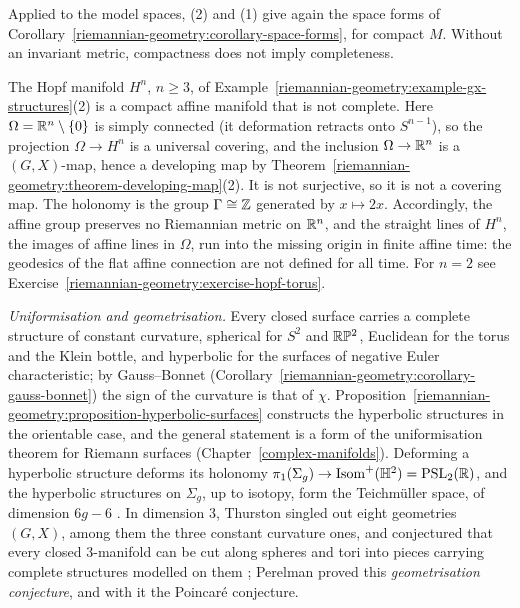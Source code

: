 Applied to the model spaces, (2) and (1) give again the space forms of Corollary~\ref{riemannian-geometry:corollary-space-forms}, for compact $M$. Without an invariant metric, compactness does not imply completeness.

\begin{example}\label{riemannian-geometry:example-hopf-incomplete}
The Hopf manifold $H^n$, $n \geq 3$, of Example~\ref{riemannian-geometry:example-gx-structures}(2) is a compact affine manifold that is not complete. Here $\Omega = \mathbb{R}^n \setminus \{0\}$ is simply connected (it deformation retracts onto
$S^{n-1}$), so the projection $\Omega \to H^n$ is a universal covering, and the inclusion $\Omega \to \mathbb{R}^n$ is a $(G, X)$-map, hence a developing map by Theorem~\ref{riemannian-geometry:theorem-developing-map}(2). It is not surjective,
so it is not a covering map. The holonomy is the group $\Gamma \cong \mathbb{Z}$ generated by $x \mapsto 2x$. Accordingly, the affine group preserves no Riemannian metric on $\mathbb{R}^n$, and the straight lines of $H^n$, the images of affine
lines in $\Omega$, run into the missing origin in finite affine time: the geodesics of the flat affine connection are not defined for all time. For $n = 2$ see Exercise~\ref{riemannian-geometry:exercise-hopf-torus}.
\end{example}

\begin{remark}\label{riemannian-geometry:remark-geometrisation}
\emph{Uniformisation and geometrisation.} Every closed surface carries a complete structure of constant curvature, spherical for $S^2$ and $\mathbb{R}\mathbb{P}^2$, Euclidean for the torus and the Klein bottle, and hyperbolic for the surfaces of
negative Euler characteristic; by Gauss--Bonnet (Corollary~\ref{riemannian-geometry:corollary-gauss-bonnet}) the sign of the curvature is that of $\chi$. Proposition~\ref{riemannian-geometry:proposition-hyperbolic-surfaces}
constructs the hyperbolic structures in the orientable case, and the general statement is a form of the uniformisation theorem for Riemann surfaces (Chapter~\ref{complex-manifolds}). Deforming a hyperbolic structure deforms its
holonomy $\pi_1(\Sigma_g) \to \mathrm{Isom}^+(\mathbb{H}^2) = \mathrm{PSL}_2(\mathbb{R})$, and the hyperbolic structures on $\Sigma_g$, up to isotopy, form the Teichm\"uller space, of dimension $6g - 6$ \cite{goldman-2022}. In dimension $3$,
Thurston singled out eight geometries $(G, X)$, among them the three constant curvature ones, and conjectured that every closed $3$-manifold can be cut along spheres and tori into pieces carrying complete
structures modelled on them \cite{thurston-1997}; Perelman proved this \emph{geometrisation conjecture}, and with it the Poincar\'e conjecture.
\end{remark}

